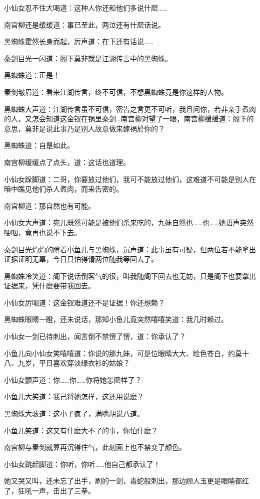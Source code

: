 \documentclass[12pt,oneside]{book}
\begin{document}
小仙女忍不住大喝道：这种人你还和他们多说什麽\ldots\ldots{}

南宫柳还是缓缓道：事已至此，两泣还有什麽话说。

黑蜘蛛霍然长身而起，厉声道：在下还有话说\ldots\ldots{}

秦剑目光一闪道：阁下莫非就是江湖传言中的黑蜘蛛。

黑蜘蛛道：正是！

秦剑皱眉道：看来江湖传言，终不可信，不想黑蜘蛛竟是你这样的人物。

黑蜘蛛大声道：江湖传言虽不可信，密告之言更不可听，我且问你，若非亲手煮肉的人，又怎会知道这金钗在锅里秦剑\ldots 南宫柳对望了一眼，南宫柳缓缓道：阁下的意思，莫非是说此事乃是别人故意做来嫁祸於你的？

黑蜘蛛道：自是如此。

南宫柳缓缓点了点头，道：这话也道理。

小仙女跺脚道：二哥，你要放过他们，我可不能放过他们，这难道不可能是别人在暗中瞧见他们杀人煮肉，而来告密的。

南宫柳道：那自然也有可能。

小仙女大声道：宛儿既然可能是被他们杀来吃的，九妹自然也\ldots\ldots 也\ldots\ldots 她语声突然哽咽，竟再也说不下去。

秦剑目光灼灼的瞪着小鱼儿与黑蜘蛛，沉声道：此事虽有可疑，但两位若不能拿出证据证明无辜，今日只怕得请两位随我等回去了。

黑蜘姝冷笑道：阁下说话倒客气的很，叫我随阁下回去也无妨，只是阁下也要拿出证据来，凭什麽要带我回去。

小仙女厉喝道：这金钗难道还不是证据！你还想赖？

黑蜘蛛眼睛一瞪，还未说话，那知小鱼儿竟突然嘻嘻笑道：我几时赖过。

小仙女一剑已待刺出，闻言倒不禁愣了愣，道：你承认了？

小鱼儿向小仙女笑嘻嘻道：你说的那九妹，可是位眼睛大大、睑色苍白，约莫十八、九岁，平日喜欢穿淡绿衣衫的姑娘？

小仙女颤声道：你\ldots\ldots 你\ldots\ldots 你将她怎麽样了？

小鱼儿大笑道：我己将她怎样，这还用说麽？

黑蜘蛛大骇道：这小子疯了，满嘴胡说八道。

小鱼儿笑道：这又有什麽大不了的事，你怕什麽？

南宫柳与秦剑就算再沉得住气，此刻面上也不禁变了颜色。

小仙女跳起脚道：你听，你听\ldots\ldots 他自己都承认了！

她又哭又叫，还未忘了出手，刷的一剑，毒蛇般刺出，那边顾人玉更是眼睛都红了，狂吼一声，击出了三拳。
\end{document}
